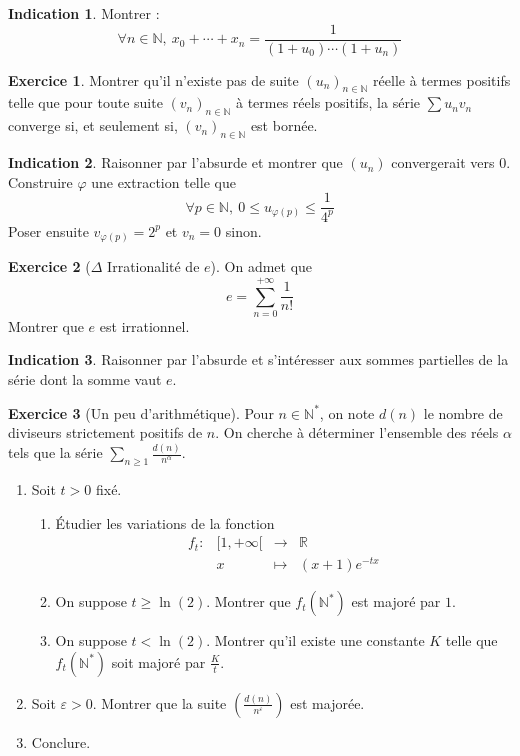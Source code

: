 \documentclass[french]{book}
\newcommand{\N}{\mathbb{N}}
\newcommand{\R}{\mathbb{R}}
\newcommand{\st}{^*}
\theoremstyle{definition}
\newtheorem{ex}{Exercice}[chapter]
\theoremstyle{theorem}
\newtheorem*{ind}{Indication}
\theoremstyle{remark}
\begin{document}
\begin{ind}
	Montrer : $$\forall n\in\N,\ x_0+\cdots+x_n=\frac{1}{(1+u_0)\cdots(1+u_n)}$$
\end{ind}

\begin{ex}
	Montrer qu'il n'existe pas de suite $(u_n)_{n\in\N}$ réelle à termes positifs telle que pour toute suite $(v_n)_{n\in\N}$ à termes réels positifs, la série $\displaystyle\sum u_nv_n$ converge si, et seulement si, $(v_n)_{n\in\N}$ est bornée.
\end{ex}

\begin{ind}
	Raisonner par l'absurde et montrer que $(u_n)$ convergerait vers $0$. Construire $\varphi$ une extraction telle que $$\forall p\in\N,\ 0\leqslant u_{\varphi(p)}\leqslant\frac{1}{4^p}$$ Poser ensuite $v_{\varphi(p)}=2^p$ et $v_n=0$ sinon.
\end{ind}

\begin{ex}[$\Delta$ Irrationalité de $e$]
	On admet que $$e=\displaystyle\sum_{n=0}^{+\infty}\frac{1}{n!}$$ Montrer que $e$ est irrationnel.
\end{ex}

\begin{ind}
	Raisonner par l'absurde et s'intéresser aux sommes partielles de la série dont la somme vaut $e$.
\end{ind}

\begin{ex}[Un peu d'arithmétique]
	Pour $n\in\N\st$, on note $d(n)$ le nombre de diviseurs strictement positifs de $n$. On cherche à déterminer l'ensemble des réels $\alpha$ tels que la série $\displaystyle\sum_{n\geqslant 1}\frac{d(n)}{n^\alpha}$.
	\begin{enumerate}
		\item Soit $t>0$ fixé. 
		\begin{enumerate}[label=\alph*.]
			\item Étudier les variations de la fonction $$\begin{array}{lrcl}
				f_t:&[1,+\infty[&\longrightarrow&\R \\
				&x&\longmapsto&(x+1)e^{-tx}
			\end{array}$$
			\item On suppose $t\geqslant \ln(2)$. Montrer que $f_t(\N\st)$ est majoré par $1$.
			\item On suppose $t<\ln(2)$. Montrer qu'il existe une constante $K$ telle que $f_t(\N\st)$ soit majoré par $\displaystyle\frac{K}{t}$.
		\end{enumerate}
		\item Soit $\varepsilon>0$. Montrer que la suite $\displaystyle\left(\frac{d(n)}{n^\varepsilon}\right)$ est majorée.
		\item Conclure.
	\end{enumerate}
\end{ex}
\end{document}
